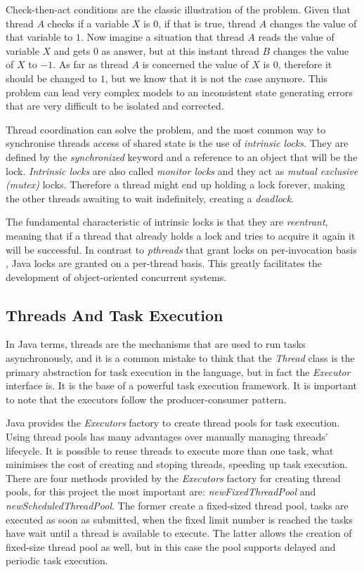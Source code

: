 Check-then-act conditions are the classic illustration of the problem. Given that thread $A$ checks if a variable $X$ is $0$, if that is true, thread $A$ changes the value of that variable to $1$. Now imagine a situation that thread $A$ reads the value of variable $X$ and gets $0$ as answer, but at this instant thread $B$ changes the value of $X$ to $-1$. As far as thread $A$ is concerned the value of $X$ is $0$, therefore it should be changed to $1$, but we know that it is not the case anymore. This problem can lead very complex models to an inconsistent state generating errors that are very difficult to be isolated and corrected. 

Thread coordination can solve the problem, and the most common way to synchronise threads access of shared state is the use of \emph{intrinsic locks}. They are defined by the \emph{synchronized} keyword and a reference to an object that will be the lock. \emph{Intrinsic locks} are also called \emph{monitor locks} and they act as \emph{mutual exclusive (mutex)} locks. Therefore a thread might end up holding a lock forever, making the other threads awaiting to wait indefinitely, creating a \emph{deadlock}. 

The fundamental characteristic of intrinsic locks is that they are \emph{reentrant}, meaning that if a thread that already holds a lock and tries to acquire it again it will be successful. In contrast to \emph{pthreads} that grant locks on per-invocation basis \cite{butenhof1997programming}, Java locks are granted on a per-thread basis. This greatly facilitates the development of object-oriented concurrent systems. \cite{goetz2006java}

\subsection{Threads And Task Execution}
\label{subsec:threads-task-exec}

In Java terms, threads are the mechanisms that are used to run tasks asynchronously, and it is a common mistake to think that the \emph{Thread} class is the primary abstraction for task execution in the language, but in fact the \emph{Executor} interface is. It is the base of a powerful task execution framework. It is important to note that the executors follow the producer-consumer pattern.

Java provides the \emph{Executors} factory to create thread pools for task execution. Using thread pools has many advantages over manually managing threads' lifecycle. It is possible to reuse threads to execute more than one task, what minimises the cost of creating and stoping threads, speeding up task execution. There are four methods provided by the \emph{Executors} factory for creating thread pools, for this project the most important are: \emph{newFixedThreadPool} and \emph{newScheduledThreadPool}. The former create a fixed-sized thread pool, tasks are executed as soon as submitted, when the fixed limit number is reached the tasks have wait until a thread is available to execute. The latter allows the creation of fixed-size thread pool as well, but in this case the pool supports delayed and periodic task execution.

